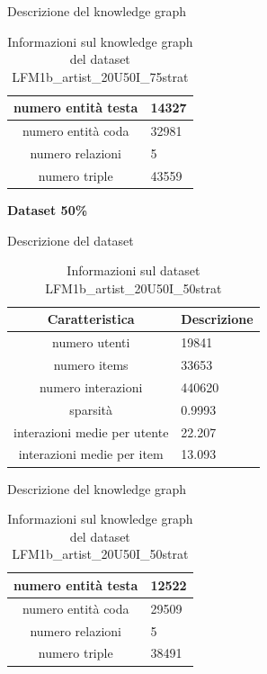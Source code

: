 \noindent Descrizione del knowledge graph
\begin{table}[H]
    \centering
    \footnotesize
    \begin{tabularx}{\textwidth}{|c|X|}
        \hline
        numero entità testa & 14327 \\
        \hline
        numero entità coda & 32981 \\
        \hline
        numero relazioni & 5 \\
        \hline
        numero triple & 43559 \\
        \hline
    \end{tabularx}
    \caption{Informazioni sul knowledge graph del dataset LFM1b\_artist\_20U50I\_75strat}
    \label{tab:dataset_info}
\end{table}

\noindent\textbf{Dataset 50\%}

\noindent Descrizione del dataset
\begin{table}[H]
    \centering
    \footnotesize
    \begin{tabularx}{\textwidth}{|c|X|}
        \hline
        \textbf{Caratteristica} & \textbf{Descrizione} \\
        \hline
        numero utenti & 19841 \\
        \hline
        numero items & 33653 \\
        \hline
        numero interazioni & 440620 \\
        \hline
        sparsità &  0.9993 \\
        \hline
        interazioni medie per utente & 22.207 \\
        \hline
        interazioni medie per item & 13.093 \\
        \hline
    \end{tabularx}
    \caption{Informazioni sul dataset LFM1b\_artist\_20U50I\_50strat}
    \label{tab:dataset_info}
\end{table}


\noindent Descrizione del knowledge graph
\begin{table}[H]
    \centering
    \footnotesize
    \begin{tabularx}{\textwidth}{|c|X|}
        \hline
        numero entità testa & 12522 \\
        \hline
        numero entità coda & 29509 \\
        \hline
        numero relazioni & 5 \\
        \hline
        numero triple & 38491 \\
        \hline
    \end{tabularx}
    \caption{Informazioni sul knowledge graph del dataset LFM1b\_artist\_20U50I\_50strat}
    \label{tab:dataset_info}
\end{table}


